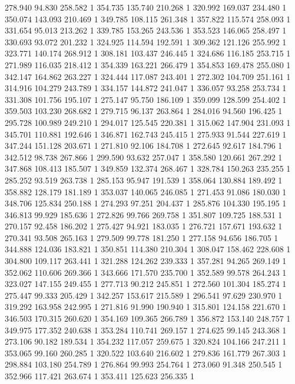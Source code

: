 	278.940	94.830	258.582	1
	354.735	135.740	210.268	1
	320.992	169.037	234.480	1
	350.074	143.093	210.469	1
	349.785	108.115	261.348	1
	357.822	115.574	258.093	1
	331.654	95.013	213.262	1
	339.785	153.265	243.536	1
	353.523	146.065	258.497	1
	330.693	93.072	201.232	1
	324.925	114.594	192.591	1
	309.362	121.126	255.992	1
	323.771	140.174	268.912	1
	308.181	103.437	246.445	1
	324.686	116.185	253.715	1
	271.989	116.035	218.412	1
	354.339	163.221	266.479	1
	354.853	169.478	255.080	1
	342.147	164.862	263.227	1
	324.444	117.087	243.401	1
	272.302	104.709	251.161	1
	314.916	104.279	243.789	1
	334.157	144.872	241.047	1
	336.057	93.258	253.734	1
	331.308	101.756	195.107	1
	275.147	95.750	186.109	1
	359.099	128.599	254.402	1
	359.503	103.230	268.682	1
	279.715	96.137	263.864	1
	284.016	94.560	196.425	1
	295.728	100.989	249.210	1
	294.017	125.545	220.381	1
	315.062	147.904	231.093	1
	345.701	110.881	192.646	1
	346.871	162.743	245.415	1
	275.933	91.544	227.619	1
	347.244	151.128	203.671	1
	271.810	92.106	184.708	1
	272.645	92.617	184.796	1
	342.512	98.738	267.866	1
	299.590	93.632	257.047	1
	358.580	120.661	267.292	1
	347.868	108.413	185.507	1
	349.859	132.374	268.467	1
	328.784	150.263	235.255	1
	285.252	93.519	263.738	1
	285.153	95.947	191.539	1
	358.064	130.884	189.492	1
	358.882	128.179	181.189	1
	353.037	140.065	246.085	1
	271.453	91.086	180.030	1
	348.706	125.834	250.188	1
	274.293	97.251	204.437	1
	285.876	104.330	195.195	1
	346.813	99.929	185.636	1
	272.826	99.766	269.758	1
	351.807	109.725	188.531	1
	270.157	92.458	186.202	1
	275.427	94.921	183.035	1
	276.721	157.671	193.632	1
	270.341	93.508	265.163	1
	279.509	99.778	181.250	1
	277.158	94.656	186.705	1
	344.888	124.036	183.821	1
	350.851	114.380	210.304	1
	308.047	158.462	228.608	1
	304.800	109.117	263.441	1
	321.288	124.262	239.333	1
	357.281	94.265	269.149	1
	352.062	110.606	269.366	1
	343.666	171.570	235.700	1
	352.589	99.578	264.243	1
	323.027	147.155	249.455	1
	277.713	90.212	245.851	1
	272.560	101.304	185.274	1
	275.447	99.333	205.429	1
	342.257	153.617	215.589	1
	296.541	97.629	230.970	1
	319.292	163.958	242.995	1
	271.816	91.990	190.940	1
	315.801	124.158	221.670	1
	346.503	170.315	260.620	1
	354.169	109.365	266.789	1
	356.872	153.140	248.757	1
	349.975	177.352	240.638	1
	353.284	110.741	269.157	1
	274.625	99.145	243.368	1
	273.106	90.182	189.534	1
	354.232	117.057	259.675	1
	320.824	104.166	247.211	1
	353.065	99.160	260.285	1
	320.522	103.640	216.602	1
	279.836	161.779	267.303	1
	298.884	103.180	254.789	1
	276.864	99.993	254.764	1
	273.060	91.348	250.545	1
	352.966	117.421	263.674	1
	353.411	125.623	256.335	1
